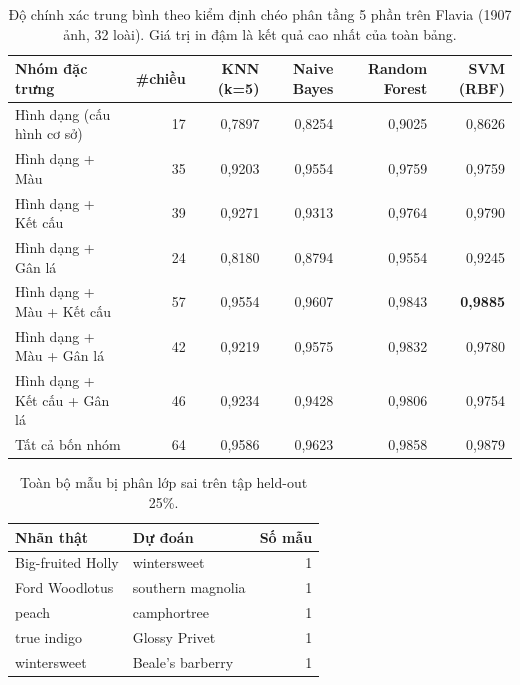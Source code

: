 \begin{table}[t]
\centering
\caption{Độ chính xác trung bình theo kiểm định chéo phân tầng 5 phần trên Flavia (1907 ảnh, 32 loài). Giá trị in đậm là kết quả cao nhất của toàn bảng.}
\label{tab:ablation}
\small
\begin{tabular}{l r r r r r}
\toprule
Nhóm đặc trưng & \#chiều & KNN (k=5) & Naive Bayes & Random Forest & SVM (RBF) \\
\midrule
Hình dạng (cấu hình cơ sở) & 17 & 0{,}7897 & 0{,}8254 & 0{,}9025 & 0{,}8626 \\
Hình dạng + Màu & 35 & 0{,}9203 & 0{,}9554 & 0{,}9759 & 0{,}9759 \\
Hình dạng + Kết cấu & 39 & 0{,}9271 & 0{,}9313 & 0{,}9764 & 0{,}9790 \\
Hình dạng + Gân lá & 24 & 0{,}8180 & 0{,}8794 & 0{,}9554 & 0{,}9245 \\
Hình dạng + Màu + Kết cấu & 57 & 0{,}9554 & 0{,}9607 & 0{,}9843 & \textbf{0{,}9885} \\
Hình dạng + Màu + Gân lá & 42 & 0{,}9219 & 0{,}9575 & 0{,}9832 & 0{,}9780 \\
Hình dạng + Kết cấu + Gân lá & 46 & 0{,}9234 & 0{,}9428 & 0{,}9806 & 0{,}9754 \\
Tất cả bốn nhóm & 64 & 0{,}9586 & 0{,}9623 & 0{,}9858 & 0{,}9879 \\
\bottomrule
\end{tabular}
\end{table}

\begin{table}[t]
\centering
\caption{Toàn bộ mẫu bị phân lớp sai trên tập held-out 25\%.}
\label{tab:errors}
\small
\begin{tabular}{l l r}
\toprule
Nhãn thật & Dự đoán & Số mẫu \\
\midrule
Big-fruited Holly & wintersweet & 1 \\
Ford Woodlotus & southern magnolia & 1 \\
peach & camphortree & 1 \\
true indigo & Glossy Privet & 1 \\
wintersweet & Beale's barberry & 1 \\
\bottomrule
\end{tabular}
\end{table}

